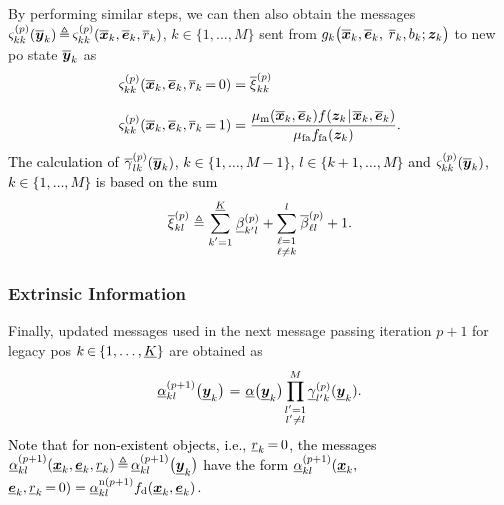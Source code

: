 \documentclass[10pt, twoside, romanappendices]{IEEEtran}
\providecommand{\rd}{\textcolor{black}}
\providecommand{\ist}{\hspace*{.3mm}}
\providecommand{\rmv}{\hspace*{-.3mm}}
\providecommand{\nn}{\nonumber}
\begin{document}
By performing similar steps, we can then also obtain the messages $\varsigma_{kk}^{(p)}(\overline{\V{y}}_{k}) \rmv\triangleq\rmv \varsigma_{kk}^{(p)}(\overline{\V{x}}_{k},  \overline{\V{e}}_{k},\overline{r}_{k})$, $k \in \{1,\dots,M\}$ sent from $g_k\big( \overline{\bm{x}}_{k},  \overline{\bm{e}}_{k},$  $\overline{r}_{k}, b_k; \bm{z}_k \big)$ to new \ac{po} state $\overline{\bm{y}}_{k}$ \vspace{.3mm} as
\begin{align}
\varsigma_{kk}^{(p)}(\overline{\V{x}}_{k}, \overline{\V{e}}_{k},  \overline{r}_k \rmv=\rmv 0)  &= \overline{\xi}_{kk}^{(p)} \nn\\[2.5mm]
\varsigma_{kk}^{(p)}(\overline{\V{x}}_{k}, \overline{\V{e}}_{k},  \overline{r}_k \rmv=\rmv 1) &= \frac{\mu_{\mathrm{m}}(\overline{\V{x}}_{k},\overline{\V{e}}_{k}) f(\V{z}_{k} \ist| \ist \overline{\V{x}}_k, \overline{\V{e}}_{k})}{\mu_{\mathrm{fa}}  f_{\mathrm{fa}}(\V{z}_{k})}.\label{eq:varSigma}\\[-5.5mm]
\nn
\end{align}
\rd{The calculation of $\overline{\gamma}^{(p)}_{lk}(\overline{\bm{y}}_{k}) $, $k \in \{1,\dots,M-1\}$, $l \in \{k+1,\dots,M\}$ and $\varsigma_{kk}^{(p)}(\overline{\bm{y}}_{k})$, $k \in \{1,\dots,M\}$ is based on the sum \vspace{0mm}}
\begin{equation}
\overline{\xi}_{kl}^{(p)} \triangleq \sum^{\underline{K}}_{\substack{k'=1}} \ist \underline{\beta}_{k'l}^{(p)} + \sum^{l}_{\substack{\ell=1\\[.5mm] \ell \neq k}} \ist \overline{\beta}_{\ell l}^{(p)} + 1. \nn
\vspace{1mm}
\end{equation}

\subsubsection{Extrinsic Information} \label{sec:exInfo} Finally, updated messages used in the next message passing iteration $p+1$ for legacy \acp{po} $k \rmv\in\rmv \{1,\dots,\underline{K}\}$  are obtained \vspace{0mm} as \cite[Eq.~(5)]{KscFreLoe:01}
\begin{equation}
\underline{\alpha}_{kl}^{(p+1)}\big(\underline{\V{y}}_{k}\big) \ist=\ist \underline{\alpha}\big(\underline{\V{y}}_{k}\big) \hspace{-.2mm} \prod^{M}_{\substack{l'=1\\l' \neq l}} \hspace{-.2mm} \underline{\gamma}^{(p)}_{l'k}(\underline{\V{y}}_{k}).
\label{eq:alphaUpdated}
\end{equation}
\rd{Note that for non-existent objects, i.e., $ \underline{r}_{k} \rmv=\rmv 0$, the messages $\underline{\alpha}_{kl}^{(p+1)}(\underline{\V{x}}_{k},\underline{\V{e}}_{k}, \underline{r}_{k}) \rmv\triangleq\rmv  \underline{\alpha}_{kl}^{(p+1)}\big(\underline{\V{y}}_{k}\big)$ have the form $\underline{\alpha}_{kl}^{(p+1)} (\underline{\bm{x}}_{k},$ $\underline{\V{e}}_{k}, \underline{r}_{k} \rmv=\rmv 0) = \underline{\alpha}^{\mathrm{n}(p+1)}_{kl} f_{\mathrm{d}}(\underline{\V{x}}_{k}, \underline{\V{e}}_{k})$.}
\end{document}

